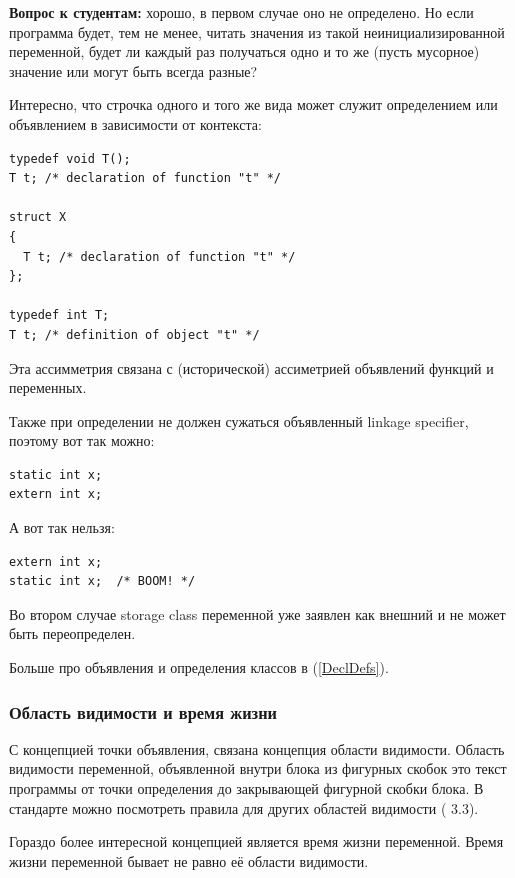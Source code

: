 \documentclass[a4paper,12pt,oneside]{article}
\newif\ifanswers
\begin{document}
\textbf{Вопрос к студентам:} хорошо, в первом случае оно не определено. Но если программа будет, тем не менее, читать значения из такой неинициализированной переменной, будет ли каждый раз получаться одно и то же (пусть мусорное) значение или могут быть всегда разные?

\ifanswers
Ответ: могут быть всегда разные, так как UB
\fi

Интересно, что строчка одного и того же вида может служит определением или объявлением в зависимости от контекста:

\begin{lstlisting}
typedef void T();
T t; /* declaration of function "t" */

struct X 
{ 
  T t; /* declaration of function "t" */
};

typedef int T;
T t; /* definition of object "t" */
\end{lstlisting}

Эта ассимметрия связана с (исторической) ассиметрией объявлений функций и переменных.

Также при определении не должен сужаться объявленный linkage specifier, поэтому вот так можно:

\begin{lstlisting}
static int x;
extern int x;
\end{lstlisting}

А вот так нельзя:

\begin{lstlisting}
extern int x;
static int x;  /* BOOM! */
\end{lstlisting}

Во втором случае storage class переменной уже заявлен как внешний и не может быть переопределен.

Больше про объявления и определения классов в (\ref{DeclDefs}).

\subsubsection{Область видимости и время жизни}\label{ScopeLifeTime}

С концепцией точки объявления, связана концепция области видимости. Область видимости  переменной, объявленной внутри блока из фигурных скобок это текст программы от точки определения до закрывающей фигурной скобки блока. В стандарте можно посмотреть правила для других областей видимости (\cite{stdcpp14} 3.3).

Гораздо более интересной концепцией является время жизни переменной. Время жизни переменной бывает не равно её области видимости.
\end{document}
